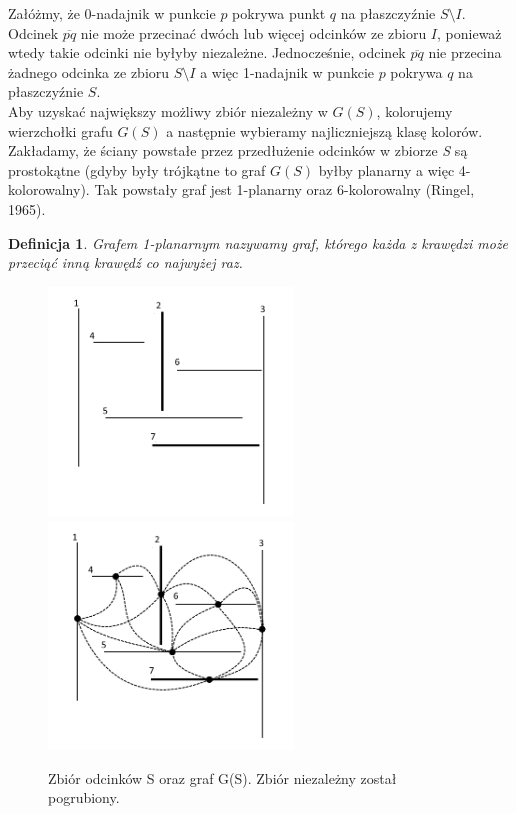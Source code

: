 \documentclass[brudnopis]{xmgr}
\newtheorem{Definicja}{Definicja} \theoremstyle{definition}
\begin{document}
\indent Załóżmy, że 0-nadajnik w punkcie $p$ pokrywa punkt $q$ na płaszczyźnie $S \setminus I$. Odcinek $\overline{pq}$ nie może przecinać dwóch lub więcej odcinków ze zbioru $I$, ponieważ wtedy takie odcinki nie byłyby niezależne. Jednocześnie, odcinek $\overline{pq}$ nie przecina żadnego odcinka ze zbioru $S \setminus I$ a więc 1-nadajnik w punkcie $p$ pokrywa $q$ na płaszczyźnie $S$.
\\\indent Aby uzyskać największy możliwy zbiór niezależny w $G(S)$, kolorujemy wierzchołki grafu $G(S)$ a następnie wybieramy najliczniejszą klasę kolorów. Zakładamy, że ściany powstałe przez przedłużenie odcinków w zbiorze \textit{S} są prostokątne (gdyby były trójkątne to graf $G(S)$ byłby planarny a więc 4-kolorowalny). 
Tak powstały graf jest 1-planarny oraz 6-kolorowalny (Ringel, 1965).

\begin{Definicja}
  Grafem 1-planarnym nazywamy graf, którego każda z krawędzi może przeciąć inną krawędź co najwyżej raz.
\end{Definicja}
\begin{figure}[ht!]
  \centering
  \includegraphics[width=6.5cm]{rysunki/zbior_odcinkow.png}
  \includegraphics[width=6.5cm]{rysunki/graf_zbioru_odcinkow.png}
  \caption{Zbiór odcinków S oraz graf G(S). Zbiór niezależny został pogrubiony.}
  \label{fig:przedluzone odcinki}
\end{figure} 
\end{document}
